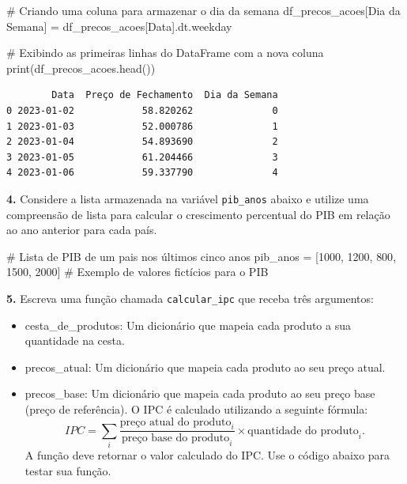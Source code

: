 \documentclass[
  portuguese,
  letterpaper,
  DIV=11,
  numbers=noendperiod]{scrreprt}
\newenvironment{Shaded}{\begin{snugshade}}{\end{snugshade}}
\newcommand{\BuiltInTok}[1]{\textcolor[rgb]{0.00,0.23,0.31}{#1}}
\newcommand{\CommentTok}[1]{\textcolor[rgb]{0.37,0.37,0.37}{#1}}
\newcommand{\DecValTok}[1]{\textcolor[rgb]{0.68,0.00,0.00}{#1}}
\newcommand{\NormalTok}[1]{\textcolor[rgb]{0.00,0.23,0.31}{#1}}
\newcommand{\OperatorTok}[1]{\textcolor[rgb]{0.37,0.37,0.37}{#1}}
\newcommand{\StringTok}[1]{\textcolor[rgb]{0.13,0.47,0.30}{#1}}
\providecommand{\tightlist}{%
  \setlength{\itemsep}{0pt}\setlength{\parskip}{0pt}}
\theoremstyle{definition}
\theoremstyle{remark}
\begin{document}
\begin{Shaded}
\begin{Highlighting}[]
\CommentTok{\# Criando uma coluna para armazenar o dia da semana}
\NormalTok{df\_precos\_acoes[}\StringTok{\textquotesingle{}Dia da Semana\textquotesingle{}}\NormalTok{] }\OperatorTok{=}\NormalTok{ df\_precos\_acoes[}\StringTok{\textquotesingle{}Data\textquotesingle{}}\NormalTok{].dt.weekday}

\CommentTok{\# Exibindo as primeiras linhas do DataFrame com a nova coluna}
\BuiltInTok{print}\NormalTok{(df\_precos\_acoes.head())}
\end{Highlighting}
\end{Shaded}

\begin{verbatim}
        Data  Preço de Fechamento  Dia da Semana
0 2023-01-02            58.820262              0
1 2023-01-03            52.000786              1
2 2023-01-04            54.893690              2
3 2023-01-05            61.204466              3
4 2023-01-06            59.337790              4
\end{verbatim}

\textbf{4.} Considere a lista armazenada na variável \texttt{pib\_anos}
abaixo e utilize uma compreensão de lista para calcular o crescimento
percentual do PIB em relação ao ano anterior para cada país.

\begin{Shaded}
\begin{Highlighting}[]
\CommentTok{\# Lista de PIB de um pais nos últimos cinco anos}
\NormalTok{pib\_anos }\OperatorTok{=}\NormalTok{ [}\DecValTok{1000}\NormalTok{, }\DecValTok{1200}\NormalTok{, }\DecValTok{800}\NormalTok{, }\DecValTok{1500}\NormalTok{, }\DecValTok{2000}\NormalTok{]  }\CommentTok{\# Exemplo de valores fictícios para o PIB}
\end{Highlighting}
\end{Shaded}

\textbf{5.} Escreva uma função chamada \texttt{calcular\_ipc} que receba
três argumentos:

\begin{itemize}
\tightlist
\item
  cesta\_de\_produtos: Um dicionário que mapeia cada produto a sua
  quantidade na cesta.
\item
  precos\_atual: Um dicionário que mapeia cada produto ao seu preço
  atual.
\item
  precos\_base: Um dicionário que mapeia cada produto ao seu preço base
  (preço de referência). O IPC é calculado utilizando a seguinte
  fórmula:
  \[IPC = \sum_i \frac{\text{preço atual do produto}_i}{\text{preço base do produto}_i}\times \text{quantidade do produto}_i.\]
  A função deve retornar o valor calculado do IPC. Use o código abaixo
  para testar sua função.
\end{itemize}
\end{document}
